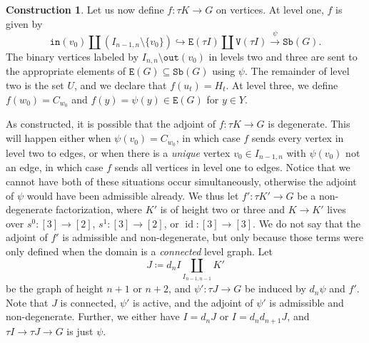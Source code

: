 \documentclass{amsart}
\numberwithin{theorem}{subsection}
\theoremstyle{definition}
\newtheorem{construction}[theorem]{Construction}
\newcommand{\id}{\operatorname{id}}
\newcommand{\sub}{\mathtt{Sb}}
\newcommand{\out}{\mathtt{out}}
\newcommand{\inp}{\mathtt{in}}
\newcommand{\edge}{\mathtt{E}}
\newcommand{\vertex}{\mathtt{V}}
\begin{document}
\begin{construction}
Let us now define $f \colon \tau K \to G$ on vertices.
At level one, $f$ is given by 
\[
	\inp(v_0) \amalg (I_{n-1,n} \setminus \{ v_0 \}) \hookrightarrow \edge(\tau I) \amalg \vertex(\tau I) \xrightarrow{\psi} \sub(G).
\]
The binary vertices labeled by $I_{n,n} \setminus \out(v_0)$ in levels two and three are sent to the appropriate elements of $\edge(G) \subseteq \sub(G)$ using $\psi$.
The remainder of level two is the set $U$, and we declare that $f(u_t) = H_t$.
At level three, we define $f(w_0) = C_{w_0}$ and $f(y) = \psi(y) \in \edge(G)$ for $y\in Y$.

As constructed, it is possible that the adjoint of $f \colon \tau K \to G$ is degenerate.
This will happen either when $\psi(v_0) = C_{w_0}$, in which case $f$ sends every vertex in level two to edges, or when there is a \emph{unique} vertex $v_0 \in I_{n-1,n}$ with $\psi(v_0)$ not an edge, in which case $f$ sends all vertices in level one to edges.
Notice that we cannot have both of these situations occur simultaneously, otherwise the adjoint of $\psi$ would have been admissible already.
We thus let $f' \colon \tau K' \to G$ be a non-degenerate factorization, where $K'$ is of height two or three and $K \to K'$ lives over $s^0\colon [3] \to [2]$, $s^1 \colon [3] \to [2]$, or $\id\colon [3] \to [3]$.
We do not say that the adjoint of $f'$ is admissible and non-degenerate, but only because those terms were only defined when the domain is a \emph{connected} level graph.
Let \[ J \coloneqq d_nI \coprod_{I_{n-1,n-1}} K'\]
be the graph of height $n+1$ or $n+2$, and $\psi' \colon \tau J \to G$ be induced by $d_n\psi$ and $f'$.
Note that $J$ is connected, $\psi'$ is active, and the adjoint of $\psi'$ is admissible and non-degenerate.
Further, we either have $I = d_{n} J$ or $I=d_{n} d_{n+1} J$, and $\tau I \to \tau J \to G$ is just $\psi$.
\end{construction}
\end{document}

